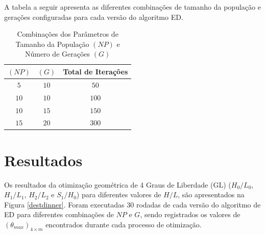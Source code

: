 \documentclass[12pt,A4,A4pt]{article}
\begin{document}
A tabela a seguir apresenta as diferentes combinações de tamanho da população e gerações configuradas para cada versão do algoritmo ED.

\begin{table}[htbp]
\small
\centering
\caption{\small Combinações dos Parâmetros de Tamanho da População $(NP)$ e Número de Gerações $(G)$}
\begin{tabular}{ccc}
\hline
$(NP)$ & $(G)$ & Total de Iterações \\
\hline
$5$ & $10$ & $50$	\\
$10$ & $10$ & $100$	\\
$10$ & $15$ & $150$	\\
$15$ & $20$ & $300$	\\
\hline
\end{tabular}
  \label{tab:popgeracao}
\end{table}

\section{Resultados}
\label{opt}
\hspace{0.5cm}Os resultados da otimização geométrica de 4 Graus de Liberdade (GL) ($H_{0}/L_{0}$, $H_{1}/L_{1}$, $H_{2}/L_{2}$ e $S_{1}/H_{0}$) para diferentes valores de $H/L$, são apresentados na Figura \ref{destdinner}. Foram executadas 30 rodadas de cada versão do algoritmo de ED para diferentes combinações de $NP$ e $G$, sendo registrados os valores de $({\theta}_{max})_{4\times m}$ encontrados durante cada processo de otimização. 
\end{document}

